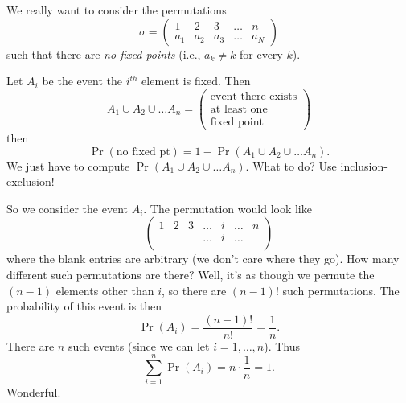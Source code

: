 \M
We really want to consider the permutations
\begin{equation}
\sigma = \begin{pmatrix} 1 & 2 & 3 & \dots & n\\
a_1 & a_2 & a_3 & \dots & a_N
\end{pmatrix}
\end{equation}
such that there are \emph{no fixed points} (i.e., $a_{k}\neq k$ for
every $k$).

Let $A_{i}$ be the event the $i^{th}$ element is fixed. Then 
\begin{equation}
A_1\cup A_2\cup\dots A_n = \begin{pmatrix}\mbox{event there exists}\\
\mbox{at least one}\\
\mbox{fixed point}
\end{pmatrix}
\end{equation}
then
\begin{equation}
\Pr(\mbox{no fixed pt}) = 1-\Pr(A_1\cup A_2\cup\dots A_n).
\end{equation}
We just have to compute $\Pr(A_1\cup A_2\cup\dots A_n)$. What to do? Use
inclusion-exclusion!

\M So we consider the event $A_{i}$. The permutation would look like
\begin{equation}
\begin{pmatrix}
1 & 2 & 3 & \dots & i & \dots & n\\
  &   &   & \dots & i & \dots &  \\
\end{pmatrix}
\end{equation}
where the blank entries are arbitrary (we don't care where they go). How
many different such permutations are there? Well, it's as though we
permute the $(n-1)$ elements other than $i$, so there are $(n-1)!$ such
permutations. The probability of this event is then
\begin{equation}
\Pr(A_{i}) = \frac{(n-1)!}{n!} = \frac{1}{n}.
\end{equation}
There are $n$ such events (since we can let $i=1,\dots,n$). Thus
\begin{equation}
\sum^{n}_{i=1}\Pr(A_{i}) = n\cdot\frac{1}{n}=1.
\end{equation}
Wonderful.

